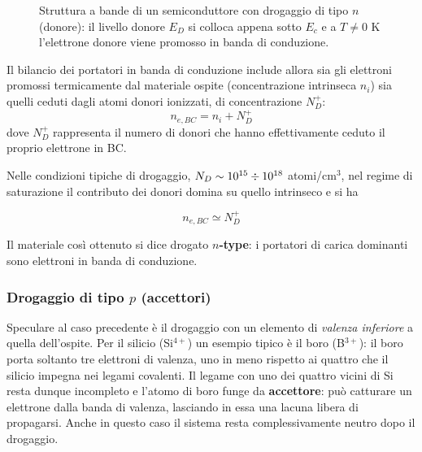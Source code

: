 \begin{figure}[htbp]
    \caption{Struttura a bande di un semiconduttore con drogaggio di tipo \( n \) (donore): il livello donore \( E_D \) si colloca appena sotto \( E_c \) e a \( T \neq 0 \) K l'elettrone donore viene promosso in banda di conduzione.}
    \label{fig:drogaggio_n_type}
\end{figure}

Il bilancio dei portatori in banda di conduzione include allora sia gli elettroni promossi termicamente dal materiale ospite (concentrazione intrinseca \( n_i \)) sia quelli ceduti dagli atomi donori ionizzati, di concentrazione \( N_D^+ \):
\begin{equation}
    n_{e, BC} = n_i + N_D^+
\end{equation}
dove \( N_D^+ \) rappresenta il numero di donori che hanno effettivamente ceduto il proprio elettrone in BC.

Nelle condizioni tipiche di drogaggio, \( N_D \sim 10^{15} \divisionsymbol 10^{18} \) atomi/cm\(^3\), nel regime di saturazione il contributo dei donori domina su quello intrinseco e si ha
\begin{importantbox}
    \begin{equation}
        n_{e, BC} \simeq N_D^+
    \end{equation}
\end{importantbox}
Il materiale così ottenuto si dice drogato \textbf{\( n \)-type}: i portatori di carica dominanti sono elettroni in banda di conduzione.

\subsubsection{Drogaggio di tipo \texorpdfstring{\( p \)}{p} (accettori)}

Speculare al caso precedente è il drogaggio con un elemento di \emph{valenza inferiore} a quella dell'ospite. Per il silicio (Si\(^{4+}\)) un esempio tipico è il boro (B\(^{3+}\)): il boro porta soltanto tre elettroni di valenza, uno in meno rispetto ai quattro che il silicio impegna nei legami covalenti. Il legame con uno dei quattro vicini di Si resta dunque incompleto e l'atomo di boro funge da \textbf{accettore}: può catturare un elettrone dalla banda di valenza, lasciando in essa una lacuna libera di propagarsi. Anche in questo caso il sistema resta complessivamente neutro dopo il drogaggio.

